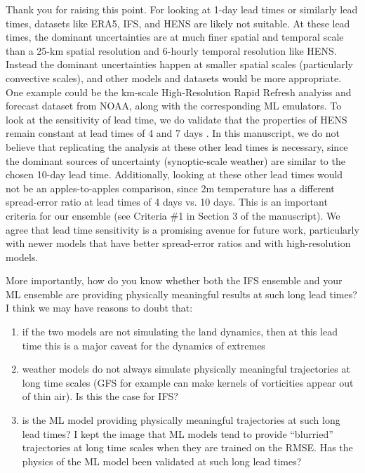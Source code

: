\documentclass[11pt]{article}
\newcommand{\newTxt}{\textcolor{cadmiumgreen}}
\begin{document}
\begin{enumerate}
    \newTxt{Thank you for raising this point.  For looking at 1-day lead times or similarly lead times, datasets like ERA5, IFS, and HENS are likely not suitable.  At these lead times, the dominant uncertainties are at much finer spatial and temporal scale than a 25-km spatial resolution and 6-hourly temporal resolution like HENS.   Instead the dominant uncertainties happen at smaller spatial scales (particularly convective scales), and other models and datasets would be more appropriate.  One example could be the km-scale High-Resolution Rapid Refresh analyiss and forecast dataset from NOAA, along with the corresponding ML emulators. To look at the sensitivity of lead time, we do validate that the properties of HENS remain constant at lead times of 4 and 7 days \citep{Mahesh2024hugeensemblespartii}.  In this manuscript, we do not believe that replicating the analysis at these other lead times is necessary, since the dominant sources of uncertainty (synoptic-scale weather) are similar to the chosen 10-day lead time. Additionally, looking at these other lead times would not be an apples-to-apples comparison, since 2m temperature has a different spread-error ratio at lead times of 4 days vs. 10 days.  This is an important criteria for our ensemble (see Criteria \#1 in Section 3 of the manuscript).  We agree that lead time sensitivity is a promising avenue for future work, particularly with newer models that have better spread-error ratios and with high-resolution models.}
    
    More importantly, how do you know whether both the IFS ensemble and your ML ensemble are providing physically meaningful results at such long lead times? I think we may have reasons to doubt that:

    \begin{enumerate}
    \item if the two models are not simulating the land dynamics, then at this lead time this is a major caveat for the dynamics of extremes 
    \item weather models do not always simulate physically meaningful trajectories at long time scales (GFS for example can make kernels of vorticities appear out of thin air). Is this the case for IFS? 
    \item is the ML model providing physically meaningful trajectories at such long lead times? I kept the image that ML models tend to provide “blurried” trajectories at long time scales when they are trained on the RMSE. Has the physics of the ML model been validated at such long lead times?
    \end{enumerate}


\end{enumerate}
\end{document}
